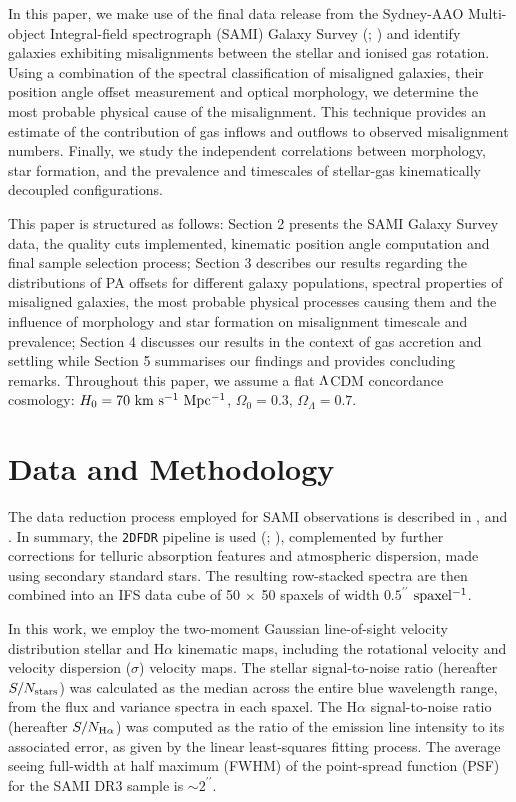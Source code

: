 \documentclass[fleqn,usenatbib]{mnras}
\begin{document}
In this paper, we make use of the final data release from the Sydney-AAO Multi-object Integral-field spectrograph (SAMI) Galaxy Survey (\citealt{Bryant2015}; \citealt{Croom2021}) and identify galaxies exhibiting misalignments between the stellar and ionised gas rotation. Using a combination of the spectral classification of misaligned galaxies, their position angle offset measurement and optical morphology, we determine the most probable physical cause of the misalignment. This technique provides an estimate of the contribution of gas inflows and outflows to observed misalignment numbers. Finally, we study the independent correlations between morphology, star formation, and  the prevalence and timescales of stellar-gas kinematically decoupled configurations.

This paper is structured as follows: Section 2 presents the SAMI Galaxy Survey data, the quality cuts implemented, kinematic position angle computation and final sample selection process; Section 3 describes our results regarding the distributions of PA offsets for different galaxy populations, spectral properties of misaligned galaxies, the most probable physical processes causing them and the influence of morphology and star formation on misalignment timescale and prevalence; Section 4 discusses our results in the context of gas accretion and settling while Section 5 summarises our findings and provides concluding remarks.
Throughout this paper, we assume a flat $\rm{\Lambda}$CDM concordance cosmology: $H_0=70\ \rm{km\ s^{-1}\ Mpc^{-1}}$, $\Omega_0=0.3$, $\Omega_{\Lambda}=0.7$.


\section{Data and Methodology}
\label{methods}

The data reduction process employed for SAMI observations is described in \cite{Sharp2015}, \cite{Allen2015} and \cite{Green2018}. In summary, the \texttt{2DFDR} pipeline is used (\citealt*{CroomSaundersHeald2004}; \citealt{SharpBirchall2010}), complemented by further corrections for telluric absorption features and atmospheric dispersion, made using secondary standard stars. The resulting row-stacked spectra are then combined into an IFS data cube of 50 $\rm{\times}$ 50 spaxels of width $0.5^{\prime\prime}$ $\rm{spaxel^{-1}}$.

In this work, we employ the two-moment Gaussian line-of-sight velocity distribution  stellar \citep{vds2017} and H$\alpha$ \citep{Ho2016} kinematic maps, including the rotational velocity and velocity dispersion ($\sigma$) velocity maps. The stellar signal-to-noise ratio (hereafter $S/N_{\rm{stars}}$) was calculated as the median across the entire blue wavelength range, from the flux and variance spectra in each spaxel. The H$\alpha$ signal-to-noise ratio (hereafter $S/N_{\rm{H\alpha}}$) was computed as the ratio of the emission line intensity to its associated error, as given by the linear least-squares fitting process. The average seeing full-width at half maximum (FWHM) of the point-spread function (PSF) for the SAMI DR3 sample is $\sim2^{\prime\prime}$.   
\end{document}
